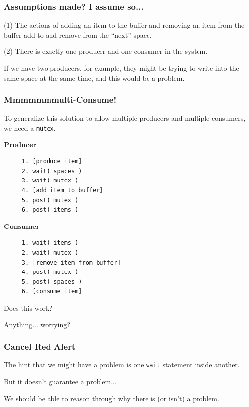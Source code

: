 \begin{frame}
	\frametitle{Assumptions made? I assume so...}

	(1) The actions of adding an item to the buffer and removing an item from the buffer add to and remove from the ``next'' space.

	(2) There is exactly one producer and one consumer in the system.

	If we have two producers, for example, they might be trying to write into the same space at the same time, and this would be a problem.


\end{frame}


\begin{frame}[fragile]
	\frametitle{Mmmmmmmulti-Consume!}

	To generalize this solution to allow multiple producers and multiple consumers, we need a \texttt{mutex}.

	\begin{multicols}{2}
		\textbf{Producer}
		\begin{verbatim}
	 1. [produce item]
	 2. wait( spaces )
	 3. wait( mutex )
	 4. [add item to buffer]
	 5. post( mutex )
	 6. post( items )
  \end{verbatim}
		\columnbreak
		\textbf{Consumer}
		\begin{verbatim}
	 1. wait( items )
	 2. wait( mutex )
	 3. [remove item from buffer]
	 4. post( mutex )
	 5. post( spaces )
	 6. [consume item]
  \end{verbatim}
	\end{multicols}
	\vspace{-2em}

	Does this work?

	Anything... worrying?

\end{frame}


\begin{frame}
	\frametitle{Cancel Red Alert}

	The hint that we might have a problem is one \texttt{wait} statement inside another.

	But it doesn't guarantee a problem...

	We should be able to reason through why there is (or isn't) a problem.

\end{frame}

